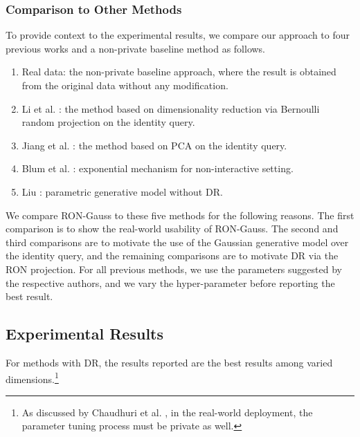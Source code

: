 \documentclass[USenglish,oneside,twocolumn]{article}
\theoremstyle{definition}
\theoremstyle{remark}
\theoremstyle{plain}
\theoremstyle{plain}
\begin{document}
\subsubsection{Comparison to Other Methods}
\vspace{-0.7em}
To provide context to the experimental results, we compare our approach
to four previous works and a non-private baseline method as follows. 
\begin{enumerate}
\item Real data: the non-private baseline approach, where the result is
obtained from the original data without any modification. 
\item Li et al. \cite{RefWorks:337}: the method based on dimensionality
reduction via Bernoulli random projection on the identity query. 
\item Jiang et al. \cite{RefWorks:339}: the method based on PCA on the
identity query.
\item Blum et al. \cite{RefWorks:174}: exponential mechanism for non-interactive
setting. 
\item Liu \cite{RefWorks:372}: parametric generative model without DR. 
\end{enumerate}
We compare RON-Gauss to these five methods for the following reasons.
The first comparison is to show the real-world usability of RON-Gauss.
The second and third comparisons are to motivate the use of the Gaussian
generative model over the identity query, and the remaining comparisons
are to motivate DR via the RON projection. For all previous methods, we
use the parameters suggested by the respective authors, and we vary
the hyper-parameter before reporting the best result.





\vspace{-1em}
\subsection{Experimental Results}
\vspace{-0.5em}
For methods with DR, the results reported are the best results among 
varied dimensions.\footnote{As discussed by Chaudhuri et al. \cite{RefWorks:188}, in the real-world
deployment, the parameter tuning process must be private as well.}
\end{document}
